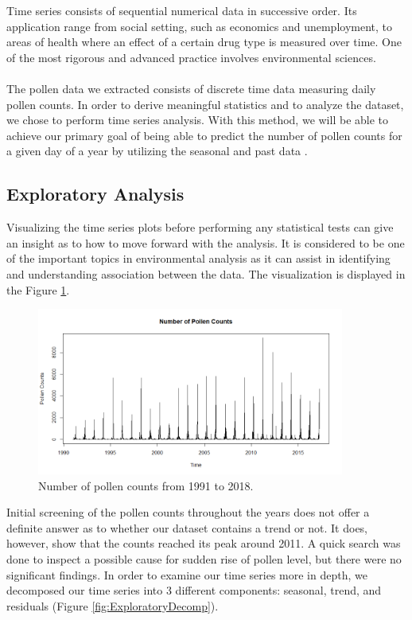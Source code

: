 \documentclass[a4paper,11pt]{article}
\begin{document}
Time series consists of sequential numerical data in successive order. Its application range from social setting, such as economics and unemployment, to areas of health where an effect of a certain drug type is measured over time. One of the most rigorous and advanced practice involves environmental sciences.\\\\
The pollen data we extracted consists of discrete time data measuring daily pollen counts. In order to derive meaningful statistics and to analyze the dataset, we chose to perform time series analysis. With this method, we will be able to achieve our primary goal of being able to predict the number of pollen counts for a given day of a year by utilizing the seasonal and past data \cite{timeseries1}.

\subsection{Exploratory Analysis}

Visualizing the time series plots before performing any statistical tests can give an insight as to how to move forward with the analysis. It is considered to be one of the important topics in environmental analysis as it can assist in identifying and understanding association between the data. The visualization is displayed in the Figure \ref{fig:exploratory1}.\\

\begin{figure}
	\centering
	\includegraphics[width=0.9\textwidth]{Exploratory1}
	\caption{Number of pollen counts from 1991 to 2018.}
	\label{fig:exploratory1}
\end{figure}

\noindent
Initial screening of the pollen counts throughout the years does not offer a definite answer as to whether our dataset contains a trend or not. It does, however, show that the counts reached its peak around 2011. A quick search was done to inspect a possible cause for sudden rise of pollen level, but there were no significant findings. In order to examine our time series more in depth, we decomposed our time series into 3 different components: seasonal, trend, and residuals (Figure \ref{fig:ExploratoryDecomp}).\\
\end{document}
